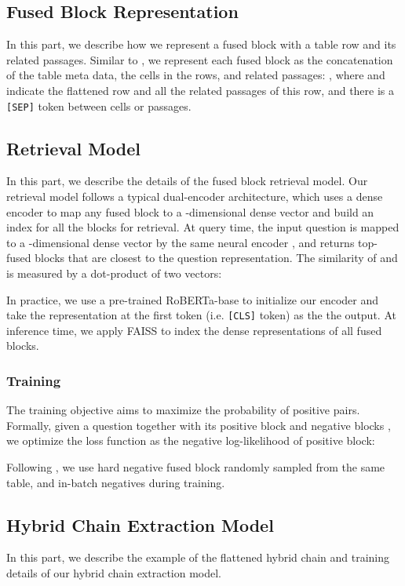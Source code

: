 \documentclass[11pt]{article}
\begin{document}
\subsection{Fused Block Representation}
In this part, we describe how we represent a fused block with a table row and its related passages. Similar to \citet{chen2020open}, we represent each fused block as the concatenation of the table meta data, the cells in the rows, and related passages: 
, where  and  indicate the flattened row and all the related passages of this row, and there is a \texttt{[SEP]} token between cells or passages.
\subsection{Retrieval Model}
In this part, we describe the details of the fused block retrieval model. Our retrieval model follows a typical dual-encoder architecture, which uses a dense encoder  to map any fused block to a -dimensional dense vector and build an index for all the blocks for retrieval.
At query time, the input question  is mapped to a -dimensional dense vector by the same neural encoder , and returns top- fused blocks that are closest to the question representation.
The similarity of  and  is measured by a dot-product of two vectors:


In practice, we use a pre-trained RoBERTa-base \cite{Liu2019RoBERTaAR} to initialize our encoder and take the representation at the first token (i.e. \texttt{[CLS]} token) as the the output. At inference time, we apply FAISS \cite{Johnson2021Faiss} to index the dense representations of all fused blocks.
\subsubsection{Training} The training objective aims to maximize the probability of positive pairs. Formally, given a question  together with  its positive block  and  negative blocks , we optimize the loss function as the negative log-likelihood of positive block:

Following \citet{karpukhin2020dense}, we use  hard negative fused block randomly sampled from the same table, and  in-batch negatives during training.
\subsection{Hybrid Chain Extraction Model}
\label{appendix:chain-extractor}
In this part, we describe the example of the flattened hybrid chain and training details of our
hybrid chain extraction model. 
\end{document}
